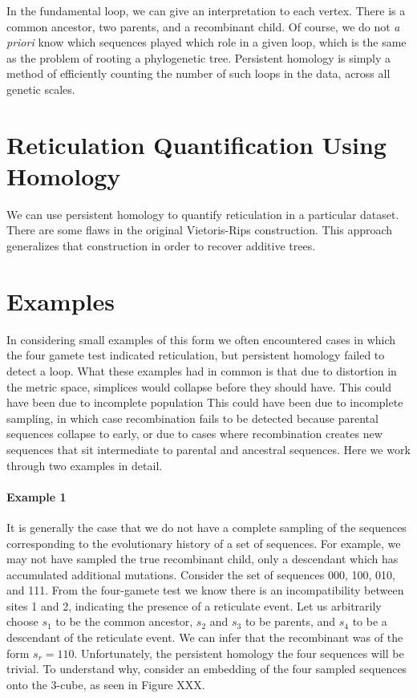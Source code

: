 In the fundamental loop, we can give an interpretation to each vertex.
There is a common ancestor, two parents, and a recombinant child.
Of course, we do not \emph{a priori} know which sequences played which role in a given loop, which is the same as the problem of rooting a phylogenetic tree.
Persistent homology is simply a method of efficiently counting the number of such loops in the data, across all genetic scales.

\section{Reticulation Quantification Using Homology}

We can use persistent homology to quantify reticulation in a particular dataset.
There are some flaws in the original Vietoris-Rips construction.
This approach generalizes that construction in order to recover additive trees.

\section{Examples}
\label{sec:examples}

In considering small examples of this form we often encountered cases in which the four gamete test indicated reticulation, but persistent homology failed to detect a loop.
What these examples had in common is that due to distortion in the metric space, simplices would collapse before they should have.
This could have been due to incomplete population
This could have been due to incomplete sampling, in which case recombination fails to be detected because parental sequences collapse to early, or due to cases where recombination creates new sequences that sit intermediate to parental and ancestral sequences.
Here we work through two examples in detail.

\paragraph{Example 1}
\label{ex:example1}
%
It is generally the case that we do not have a complete sampling of the sequences corresponding to the evolutionary history of a set of sequences.
For example, we may not have sampled the true recombinant child, only a descendant which has accumulated additional mutations.
Consider the set of sequences 000, 100, 010, and 111.
From the four-gamete test we know there is an incompatibility between sites 1 and 2, indicating the presence of a reticulate event.
Let us arbitrarily choose $s_1$ to be the common ancestor, $s_2$ and $s_3$ to be parents, and $s_4$ to be a descendant of the reticulate event.
We can infer that the recombinant was of the form $s_r=110$.
Unfortunately, the persistent homology the four sequences will be trivial.
To understand why, consider an embedding of the four sampled sequences onto the 3-cube, as seen in Figure XXX.


